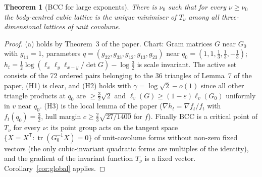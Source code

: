 \documentclass[11pt]{article}
\newtheorem{theorem}{Theorem}
\theoremstyle{remark}\newtheorem{remark}[theorem]{Remark}
\begin{document}
\begin{theorem}[BCC for large exponents]\label{thm:bcc}
There is $\nu_0$ such that for every $\nu\ge\nu_0$ the body-centred cubic lattice is the unique minimiser of $T_\nu$ among all three-dimensional lattices of unit covolume.
\end{theorem}
\begin{proof}
(a) holds by Theorem~3 of the paper. Chart: Gram matrices $G$ near $G_0$ with $g_{11}=1$, parameters $q=(g_{22},g_{33},g_{12},g_{13},g_{23})$ near $q_0=(1,1,\frac13,\frac13,-\frac13)$; $h_t=\frac12\log(\ell_x\ell_y\ell_{x-y}/\det G)-\log\frac32$ is scale invariant. The active set consists of the 72 ordered pairs belonging to the 36 triangles of Lemma~7 of the paper, (H1) is clear, and (H2) holds with $\gamma=\log\sqrt2-o(1)$ since all other triangle products at $q_0$ are $\ge\frac32\sqrt2$ and $\ell_v(G)\ge(1-\varepsilon)\ell_v(G_0)$ uniformly in $v$ near $q_0$. (H3) is the local lemma of the paper ($\nabla h_t=\nabla f_t/f_t$ with $f_t(q_0)=\frac32$, hull margin $c\ge\frac23\sqrt{27/1400}$ for $f$). Finally BCC is a critical point of $T_\nu$ for every $\nu$: its point group acts on the tangent space $\{X=X^{\mathsf T}:\operatorname{tr}(G_0^{-1}X)=0\}$ of unit-covolume forms without non-zero fixed vectors (the only cubic-invariant quadratic forms are multiples of the identity), and the gradient of the invariant function $T_\nu$ is a fixed vector. Corollary~\ref{cor:global} applies.
\end{proof}
\end{document}

